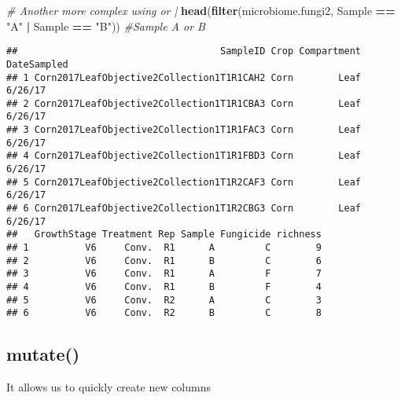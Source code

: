 \documentclass[
]{article}
\newenvironment{Shaded}{\begin{snugshade}}{\end{snugshade}}
\newcommand{\AttributeTok}[1]{\textcolor[rgb]{0.13,0.29,0.53}{#1}}
\newcommand{\CommentTok}[1]{\textcolor[rgb]{0.56,0.35,0.01}{\textit{#1}}}
\newcommand{\FunctionTok}[1]{\textcolor[rgb]{0.13,0.29,0.53}{\textbf{#1}}}
\newcommand{\NormalTok}[1]{#1}
\newcommand{\OtherTok}[1]{\textcolor[rgb]{0.56,0.35,0.01}{#1}}
\newcommand{\SpecialCharTok}[1]{\textcolor[rgb]{0.81,0.36,0.00}{\textbf{#1}}}
\newcommand{\StringTok}[1]{\textcolor[rgb]{0.31,0.60,0.02}{#1}}
\begin{document}
\begin{Shaded}
\begin{Highlighting}[]
\CommentTok{\# Another more complex using or |}
\FunctionTok{head}\NormalTok{(}\FunctionTok{filter}\NormalTok{(microbiome.fungi2, Sample }\SpecialCharTok{==} \StringTok{"A"} \SpecialCharTok{|}\NormalTok{ Sample }\SpecialCharTok{==} \StringTok{"B"}\NormalTok{)) }\CommentTok{\#Sample A or B}
\end{Highlighting}
\end{Shaded}

\begin{verbatim}
##                                    SampleID Crop Compartment DateSampled
## 1 Corn2017LeafObjective2Collection1T1R1CAH2 Corn        Leaf     6/26/17
## 2 Corn2017LeafObjective2Collection1T1R1CBA3 Corn        Leaf     6/26/17
## 3 Corn2017LeafObjective2Collection1T1R1FAC3 Corn        Leaf     6/26/17
## 4 Corn2017LeafObjective2Collection1T1R1FBD3 Corn        Leaf     6/26/17
## 5 Corn2017LeafObjective2Collection1T1R2CAF3 Corn        Leaf     6/26/17
## 6 Corn2017LeafObjective2Collection1T1R2CBG3 Corn        Leaf     6/26/17
##   GrowthStage Treatment Rep Sample Fungicide richness
## 1          V6     Conv.  R1      A         C        9
## 2          V6     Conv.  R1      B         C        6
## 3          V6     Conv.  R1      A         F        7
## 4          V6     Conv.  R1      B         F        4
## 5          V6     Conv.  R2      A         C        3
## 6          V6     Conv.  R2      B         C        8
\end{verbatim}

\subsection{mutate()}\label{mutate}

It allows us to quickly create new columns

\begin{Shaded}
\end{Shaded}
\end{document}
